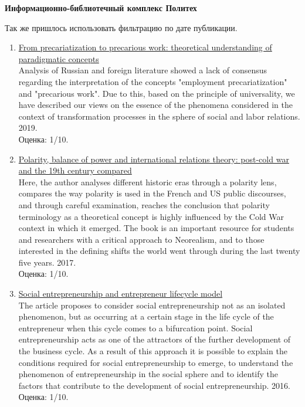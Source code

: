 \documentclass[a4paper, 12pt]{report}		%
\begin{document}
\textbf{Информационно-библиотечный комплекс Политех}

Так же пришлось использовать фильтрацию по дате публикации.

\begin{enumerate}
\item \href{https://ruslan.library.spbstu.ru/pwb/detail?db=EBOOKS&id=RU%5CSPSTU%5Cedoc%5C62081}{From precariatization to precarious work: theoretical understanding of paradigmatic concepts}\\
Analysis of Russian and foreign literature showed a lack of consensus regarding the interpretation of the concepts "employment precariatization" and "precarious work". Due to this, based on the principle of universality, we have described our views on the essence of the phenomena considered in the context of transformation processes in the sphere of social and labor relations. 2019.\\
Оценка: 1/10.
\item \href{https://ruslan.library.spbstu.ru/pwb/detail?db=EBOOKS&id=RU%5CSPSTU%5Cedoc%5C54944}{Polarity, balance of power and international relations theory: post-cold war and the 19th century compared}\\
Here, the author analyses different historic eras through a polarity lens, compares the way polarity is used in the French and US public discourses, and through careful examination, reaches the conclusion that polarity terminology as a theoretical concept is highly influenced by the Cold War context in which it emerged. The book is an important resource for students and researchers with a critical approach to Neorealism, and to those interested in the defining shifts the world went through during the last twenty five years. 2017.\\
Оценка: 1/10.
\item \href{https://ruslan.library.spbstu.ru/pwb/detail?db=ANALITS2005&id=RU%5CSPSTU%5Canalits2005%5C349543}{Social entrepreneurship and entrepreneur lifecycle model}\\
The article proposes to consider social entrepreneurship not as an isolated phenomenon, but as occurring at a certain stage in the life cycle of the entrepreneur when this cycle comes to a bifurcation point. Social entrepreneurship acts as one of the attractors of the further development of the business cycle. As a result of this approach it is possible to explain the conditions required for social entrepreneurship to emerge, to understand the phenomenon of entrepreneurship in the social sphere and to identify the factors that contribute to the development of social entrepreneurship. 2016.\\
Оценка: 1/10.
\end{enumerate}
\end{document}
